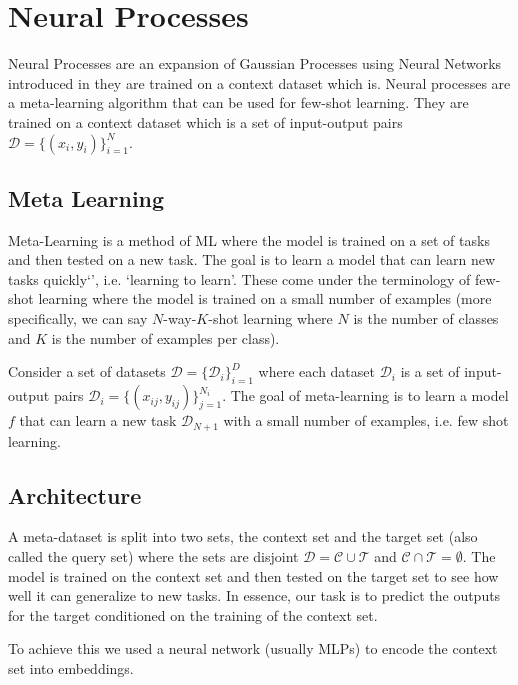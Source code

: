 \documentclass[main.tex]{subfiles}
\begin{document}
\section{Neural Processes}

Neural Processes are an expansion of Gaussian Processes using Neural Networks introduced in \cite{garnelo2018neural} they are trained on a context dataset which is. Neural processes are a meta-learning algorithm that can be used for few-shot learning. They are trained on a context dataset which is a set of input-output pairs $\mathcal{D} = \{ (x_i, y_i) \}_{i=1}^N$. 

\subsection{Meta Learning}

Meta-Learning is a method of ML where the model is trained on a set of tasks and then tested on a new task. The goal is to learn a model that can learn new tasks quickly`', i.e. `learning to learn'. These come under the terminology of few-shot learning where the model is trained on a small number of examples (more specifically, we can say $N$-way-$K$-shot learning where $N$ is the number of classes and $K$ is the number of examples per class).

Consider a set of datasets $\mathcal{D} = \{ \mathcal{D}_i \}_{i=1}^D$ where each dataset $\mathcal{D}_i$ is a set of input-output pairs $\mathcal{D}_i = \{ (x_{ij}, y_{ij}) \}_{j=1}^{N_i}$. The goal of meta-learning is to learn a model $f$ that can learn a new task $\mathcal{D}_{N+1}$ with a small number of examples, i.e. few shot learning.

\subsection{Architecture}

A meta-dataset is split into two sets, the context set and the target set (also called the query set) where the sets are disjoint $\mathcal{D} = \mathcal{C} \cup \mathcal{T}$ and $\mathcal{C} \cap \mathcal{T} = \emptyset$. The model is trained on the context set and then tested on the target set to see how well it can generalize to new tasks. In essence, our task is to predict the outputs for the target conditioned on the training of the context set.

To achieve this we used a neural network (usually MLPs) to encode the context set into embeddings. 
\end{document}
